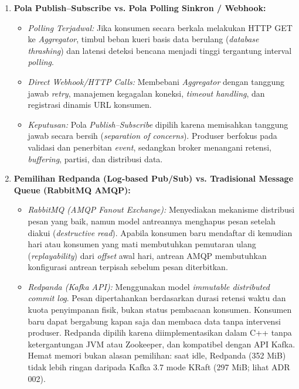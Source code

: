 \begin{enumerate}
    \item \textbf{Pola Publish--Subscribe vs. Pola Polling Sinkron / Webhook:}
    \begin{itemize}
        \item \textit{Polling Terjadwal:} Jika konsumen secara berkala melakukan \mbox{HTTP} GET ke \textit{Aggregator}, timbul beban kueri basis data berulang (\textit{database thrashing}) dan latensi deteksi bencana menjadi tinggi tergantung interval \textit{polling}.
        \item \textit{Direct Webhook/HTTP Calls:} Membebani \textit{Aggregator} dengan tanggung jawab \textit{retry}, manajemen kegagalan koneksi, \textit{timeout handling}, dan registrasi dinamis URL konsumen.
        \item \textit{Keputusan:} Pola \textit{Publish--Subscribe} dipilih karena memisahkan tanggung jawab secara bersih (\textit{separation of concerns}). Produser berfokus pada validasi dan penerbitan \textit{event}, sedangkan broker menangani retensi, \textit{buffering}, partisi, dan distribusi data.
    \end{itemize}
    \item \textbf{Pemilihan Redpanda (Log-based Pub/Sub) vs. Tradisional Message Queue (RabbitMQ AMQP):}
    \begin{itemize}
        \item \textit{RabbitMQ (AMQP Fanout Exchange):} Menyediakan mekanisme distribusi pesan yang baik, namun model antreannya menghapus pesan setelah diakui (\textit{destructive read}). Apabila konsumen baru mendaftar di kemudian hari atau konsumen yang mati membutuhkan pemutaran ulang (\textit{replayability}) dari \textit{offset} awal hari, antrean AMQP membutuhkan konfigurasi antrean terpisah sebelum pesan diterbitkan.
        \item \textit{Redpanda (Kafka API):} Menggunakan model \textit{immutable distributed commit log}. Pesan dipertahankan berdasarkan durasi retensi waktu dan kuota penyimpanan fisik, bukan status pembacaan konsumen. Konsumen baru dapat bergabung kapan saja dan membaca data tanpa intervensi produser. Redpanda dipilih karena diimplementasikan dalam C++ tanpa ketergantungan JVM atau Zookeeper, dan kompatibel dengan API Kafka. Hemat memori bukan alasan pemilihan: saat idle, Redpanda (352 MiB) tidak lebih ringan daripada Kafka 3.7 mode KRaft (297 MiB; lihat ADR 002).
    \end{itemize}
\end{enumerate}

